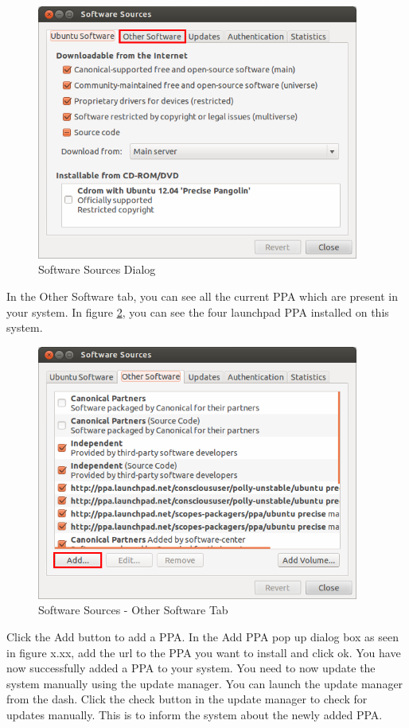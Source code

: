 \begin{figure}[h!]	
	\centering
	\includegraphics[width=300pt]{./images/applications/software-source.png}
	\caption{Software Sources Dialog}	
	\label{fig:software-source}		
\end{figure}

\par \noindent In the Other Software tab, you can see all the current PPA which are present in your system. In figure \ref{fig:software-source-ppa}, you can see the four launchpad PPA installed on this system.  \\

\begin{figure}[h!]	
	\centering
	\includegraphics[width=300pt]{./images/applications/software-source-ppa.png}
	\caption{Software Sources - Other Software Tab}	
	\label{fig:software-source-ppa}		
\end{figure}

\par \noindent Click the Add button to add a PPA. In the Add PPA pop up dialog box as seen in figure x.xx, add the url to the PPA you want to install and click ok. You have now successfully added a PPA to your system. You need to now update the system manually using the update manager. You can launch the update manager from the dash. Click the check button in the update manager to check for updates manually. This is to inform the system about the newly added PPA. \\

